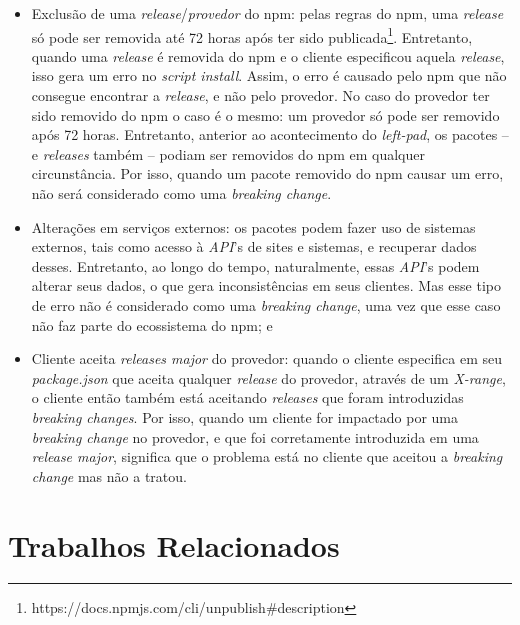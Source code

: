\begin{itemize}
    \item Exclusão de uma \textit{release}/\textit{provedor} do \gls{npm}: pelas regras do \gls{npm}, uma \textit{release} só pode ser removida até 72 horas após ter sido publicada\footnote{https://docs.npmjs.com/cli/unpublish\#description}. Entretanto, quando uma \textit{release} é removida do \gls{npm} e o cliente especificou aquela \textit{release}, isso gera um erro no \textit{script install}. Assim, o erro é causado pelo \gls{npm} que não consegue encontrar a \textit{release}, e não pelo provedor. No caso do provedor ter sido removido do \gls{npm} o caso é o mesmo: um provedor só pode ser removido após 72 horas. Entretanto, anterior ao acontecimento do \textit{left-pad}, os pacotes -- e \textit{releases} também -- podiam ser removidos do \gls{npm} em qualquer circunstância. Por isso, quando um pacote removido do \gls{npm} causar um erro, não será considerado como uma \textit{breaking change}.
    \item Alterações em serviços externos: os pacotes podem fazer uso de sistemas externos, tais como acesso à \textit{API}'s de sites e sistemas, e recuperar dados desses. Entretanto, ao longo do tempo, naturalmente, essas \textit{API}'s podem alterar seus dados, o que gera inconsistências em seus clientes. Mas esse tipo de erro não é considerado como uma \textit{breaking change}, uma vez que esse caso não faz parte do ecossistema do \gls{npm}; e
    \item Cliente aceita \textit{releases major} do provedor: quando o cliente especifica em seu \textit{package.json} que aceita qualquer \textit{release} do provedor, através de um \textit{X-range}, o cliente então também está aceitando \textit{releases} que foram introduzidas \textit{breaking changes}. Por isso, quando um cliente for impactado por uma \textit{breaking change} no provedor, e que foi corretamente introduzida em uma \textit{release major}, significa que o problema está no cliente que aceitou a \textit{breaking change} mas não a tratou.
\end{itemize}{}

\section{Trabalhos Relacionados}
\label{sec:related_works}

